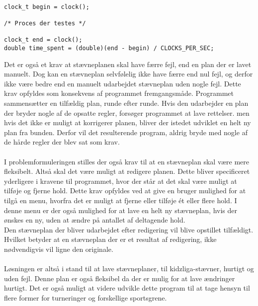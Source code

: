 \begin{listing}
\begin{verbatim}

clock_t begin = clock();

/* Proces der testes */

clock_t end = clock();
double time_spent = (double)(end - begin) / CLOCKS_PER_SEC;

\end{verbatim}
\label{code:timeTest}
\end{listing}

Det er også et krav at stævneplanen skal have færre fejl, end en plan der er lavet manuelt. Dog kan en stævneplan selvfølelig ikke have færre end nul fejl, og derfor ikke være bedre end en manuelt udarbejdet stævneplan uden nogle fejl. 
Dette krav opfyldes som konsekvens af programmet fremgangsmåde. Programmet sammensætter en tilfældig plan, runde efter runde. Hvis den udarbejder en plan der bryder nogle af de opsatte regler, forsøger programmet at lave rettelser. men hvis det ikke er muligt at korrigerer planen, bliver der istedet udviklet en helt ny plan fra bunden. Derfor vil det resulterende program, aldrig bryde med nogle af de hårde regler der blev sat som krav. 
\\\\
I problemformuleringen stilles der også krav til at en stævneplan skal være mere fleksibelt. Altså skal det være muligt at redigere planen. Dette bliver specificeret yderligere i kravene til programmet, hvor der står at det skal være muligt at tilføje og fjerne hold.
Dette krav opfyldes ved at give en bruger mulighed for at tilgå en menu, hvorfra det er muligt at fjerne eller tilføje ét eller flere hold. I denne menu er der også mulighed for at lave en helt ny stævneplan, hvis der ønskes en ny, uden at ændre på antallet af deltagende hold.
\\
Den stævneplan der bliver udarbejdet efter redigering vil blive opstillet tilfældigt. Hvilket betyder at en stævneplan der er et resultat af redigering, ikke nødvendigvis vil ligne den originale.
\\\\
Løsningen er altså i stand til at lave stævneplaner, til kidzliga-stævner, hurtigt og uden fejl. Denne plan er også fleksibel da der er mulig for at lave ændringer hurtigt. Det er også muligt at videre udvikle dette program til at tage hensyn til flere former for turneringer og forskellige sportsgrene.



